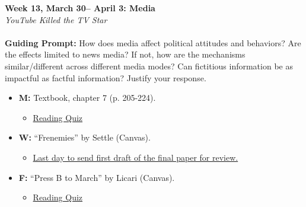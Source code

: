 \documentclass[11pt]{article}
\def\doubleq#1{``#1''}
\begin{document}
\textbf{Week 13, March 30-- April 3: Media}
\\
\textit{YouTube Killed the TV Star}
\\\\
\textbf{Guiding Prompt:} How does media affect political attitudes and behaviors? Are the effects limited to news media? If not, how are the mechanisms similar/different across different media modes? Can fictitious information be as impactful as factful information? Justify your response.
\begin{itemize}
\item \textbf{M:} Textbook, chapter 7 (p. 205-224).
\begin{itemize}
\item\underline{Reading Quiz}
\end{itemize}
\item \textbf{W:} \doubleq{Frenemies} by Settle (Canvas).
\begin{itemize}
\item \underline{Last day to send first draft of the final paper for review.}
\end{itemize}
\item \textbf{F:} \doubleq{Press B to March} by Licari (Canvas).
\begin{itemize}
\item\underline{Reading Quiz}
\end{itemize}
\end{itemize}
\end{document}
